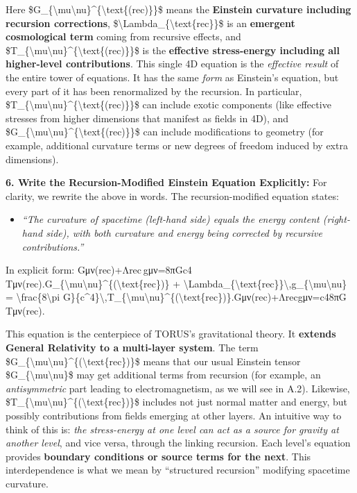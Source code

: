 Here
\$G\_\{\textbackslash{}mu\textbackslash{}nu\}\^{}\{\textbackslash{}text\{(rec)\}\}\$
means the \textbf{Einstein curvature including recursion corrections},
\$\textbackslash{}Lambda\_\{\textbackslash{}text\{rec\}\}\$ is an
\textbf{emergent cosmological term} coming from recursive effects, and
\$T\_\{\textbackslash{}mu\textbackslash{}nu\}\^{}\{\textbackslash{}text\{(rec)\}\}\$
is the \textbf{effective stress-energy including all higher-level
contributions}​. This single 4D equation is the \emph{effective result}
of the entire tower of equations. It has the same \emph{form} as
Einstein's equation, but every part of it has been renormalized by the
recursion. In particular,
\$T\_\{\textbackslash{}mu\textbackslash{}nu\}\^{}\{\textbackslash{}text\{(rec)\}\}\$
can include exotic components (like effective stresses from higher
dimensions that manifest as fields in 4D), and
\$G\_\{\textbackslash{}mu\textbackslash{}nu\}\^{}\{\textbackslash{}text\{(rec)\}\}\$
can include modifications to geometry (for example, additional curvature
terms or new degrees of freedom induced by extra dimensions).

\textbf{6. Write the Recursion-Modified Einstein Equation Explicitly:}
For clarity, we rewrite the above in words. The recursion-modified
equation states​:

\begin{itemize}
\item
  \emph{``The curvature of spacetime (left-hand side) equals the energy
  content (right-hand side), with both curvature and energy being
  corrected by recursive contributions.''}
\end{itemize}

In explicit form:
Gμν(rec)+Λrec gμν=8πGc4 Tμν(rec).G\_\{\textbackslash{}mu\textbackslash{}nu\}\^{}\{(\textbackslash{}text\{rec\})\}
+
\textbackslash{}Lambda\_\{\textbackslash{}text\{rec\}\}\textbackslash{},g\_\{\textbackslash{}mu\textbackslash{}nu\}
= \textbackslash{}frac\{8\textbackslash{}pi
G\}\{c\^{}4\}\textbackslash{},T\_\{\textbackslash{}mu\textbackslash{}nu\}\^{}\{(\textbackslash{}text\{rec\})\}.Gμν(rec)​+Λrec​gμν​=c48πG​Tμν(rec)​.

This equation is the centerpiece of TORUS's gravitational theory. It
\textbf{extends General Relativity to a multi-layer system}. The term
\$G\_\{\textbackslash{}mu\textbackslash{}nu\}\^{}\{(\textbackslash{}text\{rec\})\}\$
means that our usual Einstein tensor
\$G\_\{\textbackslash{}mu\textbackslash{}nu\}\$ may get additional terms
from recursion (for example, an \emph{antisymmetric} part leading to
electromagnetism, as we will see in A.2). Likewise,
\$T\_\{\textbackslash{}mu\textbackslash{}nu\}\^{}\{(\textbackslash{}text\{rec\})\}\$
includes not just normal matter and energy, but possibly contributions
from fields emerging at other layers. An intuitive way to think of this
is: \emph{the stress-energy at one level can act as a source for gravity
at another level}, and vice versa, through the linking recursion. Each
level's equation provides \textbf{boundary conditions or source terms
for the next}​. This interdependence is what we mean by ``structured
recursion'' modifying spacetime curvature.


